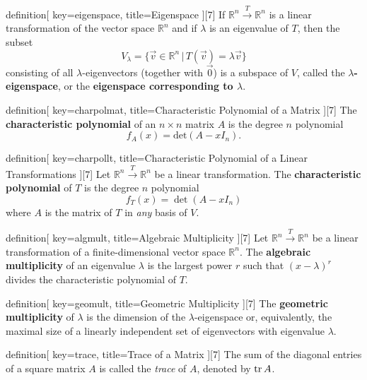 \begin{SaveConcept}{definition}[
		key=eigenspace,
		title={Eigenspace}
	][7]
	If $\mathbb R^n \overset{T}\longrightarrow \mathbb R^n$ is a linear transformation of the vector space $\mathbb R^n$ and if $\lambda$ is an eigenvalue of $T$, then the subset
	$$
	V_{\lambda} = \{ \vec v \in \mathbb R^n \, | \, T(\vec v) = \lambda \vec v \} 
	$$
	consisting of all $\lambda$-eigenvectors (together with $\vec 0$) is a subspace of $V$, called the {\bf $\lambda$-eigenspace}, or the {\bf eigenspace corresponding to $\lambda$}.
\end{SaveConcept}


\begin{SaveConcept}{definition}[
		key=charpolmat,
		title={Characteristic Polynomial of a Matrix}
	][7]
	The {\bf characteristic polynomial} of an $n\times n$ matrix $A$ is the degree $n$ polynomial 
	$$
        f_A(x) =  \text{det} (A - xI_n).
        $$ 
\end{SaveConcept}


\begin{SaveConcept}{definition}[
		key=charpollt,
		title={Characteristic Polynomial of a Linear Transformations}
	][7]
	Let $\mathbb R^n \overset{T}\longrightarrow \mathbb R^n$ be a linear transformation. The {\bf characteristic polynomial} of $T$ is the degree $n$ polynomial
	$$
        f_T(x) = \det (A - x I_n)
        $$ 
        where $A$ is the matrix of $T$ in {\it any} basis of $V$. 
\end{SaveConcept}


\begin{SaveConcept}{definition}[
		key=algmult,
		title={Algebraic Multiplicity}
	][7]
        Let $\mathbb R^n \overset{T}\longrightarrow \mathbb R^n$ be a linear transformation of a finite-dimensional vector space $\mathbb R^n$. The {\bf algebraic multiplicity} of an eigenvalue $\lambda$ is the largest power $r$ such that $(x-\lambda)^r$ divides the characteristic polynomial of $T$.
\end{SaveConcept}


\begin{SaveConcept}{definition}[
		key=geomult,
		title={Geometric Multiplicity}
	][7]
        The {\bf geometric multiplicity} of  $\lambda$ is the dimension of the $\lambda$-eigenspace or, equivalently, the maximal size of a linearly independent set of eigenvectors with eigenvalue $\lambda$.
\end{SaveConcept}

\begin{SaveConcept}{definition}[
		key=trace,
		title={Trace of a Matrix}
	][7]
        The sum of the diagonal entries of a square matrix $A$ is called the \textit{trace} of $A$, denoted by $\operatorname{tr} A$. 
\end{SaveConcept}


